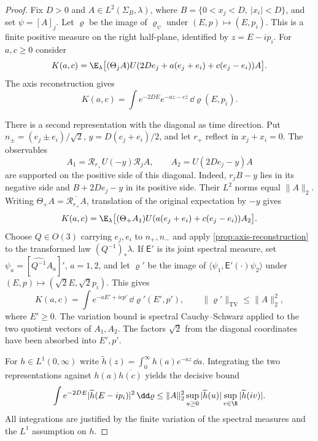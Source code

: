 \begin{proof}
Fix $D>0$ and $A\in L^2(\Sigma_B,\lambda)$, where
$B=\{0<x_j<D,\ |x_i|<D\}$, and set $\psi=[A]_j$.
Let $\varrho$ be the image of $\varrho_\psi$ under
$(E,p)\mapsto(E,p_i)$. This is a finite positive measure on the
right half-plane, identified by $z=E-ip_i$.
For $a,c\ge0$ consider
\[
 K(a,c)=\E_\lambda\bigl[(\Theta_j A)
 U(2De_j+a(e_j+e_i)+c(e_j-e_i))A\bigr].
\]
The axis reconstruction gives
\begin{equation}\label{eq:cone-first-picture}
 K(a,c)=\int e^{-2DE}e^{-az-c\overline z}\,\dd\varrho(E,p_i).
\end{equation}

There is a second representation with the diagonal as time direction.
Put $n_\pm=(e_j\pm e_i)/\sqrt2$, $y=D(e_j+e_i)/2$, and let
$r_+$ reflect in $x_j+x_i=0$. The observables
\[
 A_1=\mathcal R_{r_+}U(-y)\mathcal R_j A,
 \qquad A_2=U(2De_j-y)A
\]
are supported on the positive side of this diagonal. Indeed,
$r_jB-y$ lies in its negative side and $B+2De_j-y$ in its positive
side. Their $L^2$ norms equal $\|A\|_2$.
Writing $\Theta_+A=\overline{\mathcal R_{r_+}A}$, translation of
the original expectation by $-y$ gives
\[
 K(a,c)=\E_\lambda\bigl[(\Theta_+A_1)
 U(a(e_j+e_i)+c(e_j-e_i))A_2\bigr].
\]
Choose $Q\in O(3)$ carrying $e_j,e_i$ to $n_+,n_-$ and apply
\cref{prop:axis-reconstruction} to the transformed law
$(Q^{-1})_*\lambda$. If $\mathsf E'$ is its joint spectral measure,
set $\psi_a=[\widehat{Q^{-1}}A_a]'$, $a=1,2$, and let
$\varrho'$ be the image of
$\langle\psi_1,\mathsf E'(\cdot)\psi_2\rangle$
under $(E,p)\mapsto(\sqrt2E,\sqrt2p_i)$. This gives
\begin{equation}\label{eq:cone-second-picture}
 K(a,c)=\int e^{-aE'+icp'}\,\dd\varrho'(E',p'),
 \qquad \|\varrho'\|_{\mathrm{TV}}\le\|A\|_2^2,
\end{equation}
where $E'\ge0$. The variation bound is spectral
Cauchy--Schwarz applied to the two quotient vectors of $A_1,A_2$.
The factors $\sqrt2$ from the diagonal coordinates have been absorbed
into $E',p'$.

For $h\in L^1(0,\infty)$ write
$\widetilde h(z)=\int_0^\infty h(a)e^{-az}\,\dd a$.
Integrating the two representations against
$h(a)\overline{h(c)}$ yields the decisive bound
\begin{equation}\label{eq:two-Laplace-bound}
 \int e^{-2DE}|\widetilde h(E-ip_i)|^2\,\dd\varrho
 \le\|A\|_2^2
 \sup_{u\ge0}|\widetilde h(u)|
 \sup_{v\in\R}|\widetilde h(iv)|.
\end{equation}
All integrations are justified by the finite variation of the
spectral measures and the $L^1$ assumption on $h$.


\end{proof}
